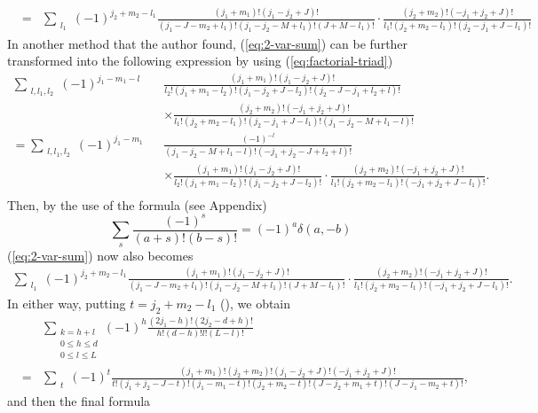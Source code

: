 \documentclass{article}
\begin{document}
{\begin{eqnarray}
&=&  \sum_{\substack{l_1}} (-1)^{j_2 + m_2 -l_1} \frac{(j_1+m_1)!(j_1-j_2+J)!}{(j_1 - J - m_2 + l_1)!(j_1 - j_2 - M + l_1)!(J + M - l_1)!}\cdot\frac{(j_2+m_2)!(-j_1+j_2+J)!}{l_1!(j_2+m_2-l_1)!(j_2-j_1+J-l_1)!} \nonumber
\end{eqnarray}
In another method that the author found, (\ref{eq:2-var-sum}) can be further transformed into the following expression by using (\ref{eq:factorial-triad})
\begin{eqnarray}
\sum_{\substack{l,l_1, l_2}} (-1)^{j_1 -m_1 -l} & & \frac{(j_1+m_1)! (j_1 - j_2 +J)!}{l_2!(j_1+m_1-l_2)! (j_1-j_2+J-l_2)! (j_2-J-j_1+l_{2} + l)!}  \nonumber\\
                                                & & \times \frac{(j_2+m_2)!(-j_1+j_2+J)!}{l_1!(j_2+m_2-l_1)!(j_2-j_1+J-l_1)!(j_1-j_2-M+l_1-l)!}  \nonumber \\
=\sum_{\substack{l,l_1, l_2}} (-1)^{j_1 -m_1} & & \frac{(-1)^{-l}}{ (j_1-j_2-M+l_1-l)! (-j_{1}+j_2-J+l_{2} + l)!}  \nonumber\\
                                             & & \times \frac{(j_1+m_1)! (j_1 - j_2 +J)!}{l_2!(j_1+m_1-l_2)! (j_1-j_2+J-l_2)! } \cdot \frac{(j_2+m_2)!(-j_1+j_2+J)!}{l_1!(j_2+m_2-l_1)!(-j_1+j_{2}+J-l_1)!}. \nonumber \\
\end{eqnarray}
Then, by the use of the formula (see Appendix)
\begin{equation}
\label{eq:fractional-delta}
\sum_{s} \frac{(-1)^{s}}{(a+s)!(b-s)!} = (-1)^{a} \delta(a, -b)
\end{equation}
(\ref{eq:2-var-sum}) now also becomes
\begin{eqnarray}
\sum_{\substack{l_1}} (-1)^{j_2 + m_2 -l_1} \frac{(j_1+m_1)!(j_1-j_2+J)!}{(j_1 - J - m_2 + l_1)!(j_1 - j_2 - M + l_1)!(J + M - l_1)!}\cdot\frac{(j_2+m_2)!(-j_1+j_2+J)!}{l_1!(j_2+m_2-l_1)!(-j_1+j_2+J-l_1)!} \nonumber.
\end{eqnarray}
In either way, putting $t=j_2 + m_2 -l_1$ (\cite{Racah}), we obtain
\begin{eqnarray}
&&\sum_{\substack{k=h+l\\0\le h \le d\\0\le l \le L}}  (-1)^h \frac{(2j_1-h)!(2j_2-d+h)!}{h!(d-h)!l!(L-l)!} \nonumber\\
&=& \sum_{\substack{t}} (-1)^t \frac{(j_1+m_1)!(j_2+m_2)!(j_1-j_2+J)!(-j_1+j_2+J)!}{t!(j_1 + j_2 -J - t)!(j_1 - m_1 - t)!(j_2 +m_2 -t)!(J-j_2 +m_1+t)!(J-j_1 -m_2 +t)!} \nonumber,
\end{eqnarray}
and then the final formula
}
\end{document}
